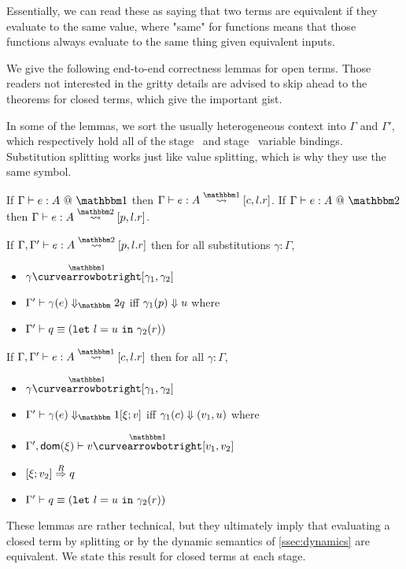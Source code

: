 Essentially, we can read these as saying that two terms are equivalent if they evaluate to the same value,
where "same" for functions means that those functions always evaluate to the same thing given equivalent inputs.

We give the following end-to-end correctness lemmas for open terms. 
Those readers not interested in the gritty details are advised to skip ahead to the theorems for closed terms, which give the important gist.

In some of the lemmas, we sort the usually heterogeneous context into $\Gamma$ and $\Gamma'$, 
which respectively hold all of the stage \bbone\ and stage \bbtwo\ variable bindings.
Substitution splitting works just like value splitting, which is why they use the same symbol.

\begin{lemma}
If $\typesone e A$ then
$\Gamma\vdash e : A \splitonesym [c,l.r]$.
If $\typestwo e A$ then
$\Gamma\vdash e : A \splittwosym [p,l.r]$.
\end{lemma}

\begin{lemma}
If $\Gamma, \Gamma'\vdash e : A \splittwosym [p,l.r]$ then for all substitutions $\gamma : \Gamma$,
\begin{itemize}
\item $\gamma \vsplito [\gamma_1, \gamma_2]$
\item $\diatwo [\Gamma'] {\gamma(e)} q$ iff ${\gamma_1(p)} \Downarrow {u}$ where
\item $\Gamma' \vdash q \equiv ({\tt let}~{l} = {u}~{\tt in}~{\gamma_2(r)})$
\end{itemize}
\end{lemma}

\begin{lemma}
If $\Gamma, \Gamma'\vdash e : A \splitonesym [c,l.r]$ then for all $\gamma : \Gamma$,
\begin{itemize}
\item $\gamma \vsplito [\gamma_1, \gamma_2]$
\item $\diaone [\Gamma'] {\gamma(e)} {\xi;v}$ iff ${\gamma_1(c)} \Downarrow {(v_1,u)}$ where
\item $\Gamma',\dom \xi \vdash v \vsplito [v_1,v_2]$
\item $[{\xi};{v_2}]\overset{R}\Rightarrow{q}$
\item $\Gamma'\vdash q \equiv ({\tt let}~{l} = {u}~{\tt in}~{\gamma_2(r)})$
\end{itemize}
\end{lemma}

These lemmas are rather technical, but they ultimately imply that evaluating a
closed term by splitting or by the dynamic semantics of \ref{ssec:dynamics} are
equivalent. 
We state this result for closed terms at each stage.

